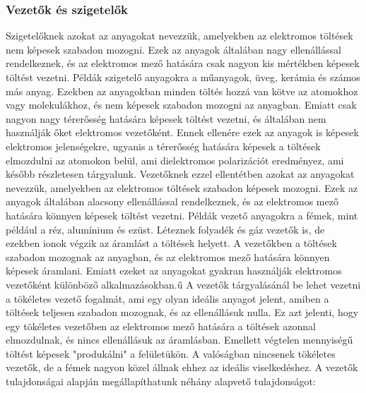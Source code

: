 \documentclass[a4paper,12pt]{article}
\begin{document}
\subsubsection{Vezetők és szigetelők}
Szigetelőknek azokat az anyagokat nevezzük, amelyekben az elektromos töltések nem képesek szabadon mozogni. Ezek az anyagok általában nagy ellenállással rendelkeznek, és az elektromos mező hatására csak nagyon kis mértékben képesek töltést vezetni. Példák szigetelő anyagokra a műanyagok, üveg, kerámia és számos más anyag.
Ezekben az anyagokban minden töltés hozzá van kötve az atomokhoz vagy molekulákhoz, és nem képesek szabadon mozogni az anyagban. Emiatt csak nagyon nagy térerősség hatására képesek töltést vezetni, és általában nem használják őket elektromos vezetőként. Ennek ellenére ezek
az anyagok is képesek elektromos jelenségekre, ugyanis a térerősség hatására képesek a töltések elmozdulni az atomokon belül, ami dielektromos polarizációt eredményez, ami később részletesen tárgyalunk.
\newline
\newline
Vezetőknek ezzel ellentétben azokat az anyagokat nevezzük, amelyekben az elektromos töltések szabadon képesek mozogni. Ezek az anyagok általában alacsony ellenállással rendelkeznek, és az elektromos mező hatására könnyen képesek töltést vezetni. Példák vezető anyagokra a fémek, mint például a réz, alumínium és ezüst.
Léteznek folyadék és gáz vezetők is, de ezekben ionok végzik az áramlást a töltések helyett. A vezetőkben a töltések szabadon mozognak az anyagban, és az elektromos mező hatására könnyen képesek áramlani. Emiatt ezeket az anyagokat gyakran használják elektromos vezetőként különböző alkalmazásokban.ű
A vezetők tárgyalásánál be lehet vezetni a tökéletes vezető fogalmát, ami egy olyan ideális anyagot jelent, amiben a töltések teljesen szabadon mozognak, és az ellenállásuk nulla. Ez azt jelenti, hogy egy tökéletes vezetőben az elektromos mező hatására a töltések azonnal elmozdulnak, és nincs ellenállásuk az áramlásban.
Emellett végtelen mennyiségű töltést képesek "produkálni" a felületükön. A valóságban nincsenek tökéletes vezetők, de a fémek nagyon közel állnak ehhez az ideális viselkedéshez.
\newline
\newline
A vezetők tulajdonságai alapján megállapíthatunk néhány alapvető tulajdonságot:
\end{document}
